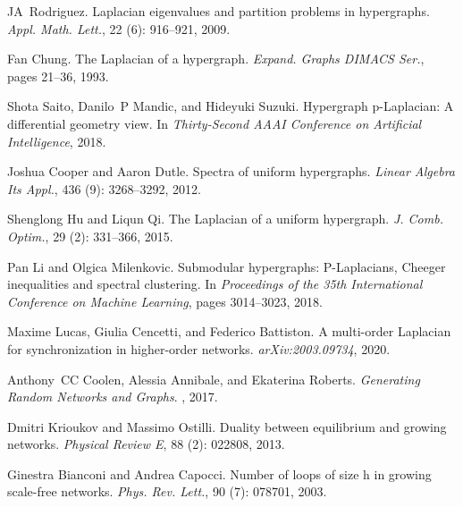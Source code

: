 JA~Rodriguez.
\newblock Laplacian eigenvalues and partition problems in hypergraphs.
\newblock \emph{Appl. Math. Lett.}, 22 (6): 916--921, 2009.

Fan Chung.
\newblock The {Laplacian} of a hypergraph.
\newblock \emph{Expand. Graphs DIMACS Ser.}, pages 21--36, 1993.

Shota Saito, Danilo~P Mandic, and Hideyuki Suzuki.
\newblock Hypergraph p-{{Laplacian}}: {{A}} differential geometry view.
\newblock In \emph{Thirty-Second {{AAAI}} Conference on Artificial
    Intelligence}, 2018.

Joshua Cooper and Aaron Dutle.
\newblock Spectra of uniform hypergraphs.
\newblock \emph{Linear Algebra Its Appl.}, 436 (9):
3268--3292, 2012.

Shenglong Hu and Liqun Qi.
\newblock The {Laplacian} of a uniform hypergraph.
\newblock \emph{J. Comb. Optim.}, 29 (2): 331--366, 2015.

Pan Li and Olgica Milenkovic.
\newblock Submodular hypergraphs: {P}-{Laplacians}, {Cheeger} inequalities and
spectral clustering.
\newblock In \emph{Proceedings of the 35th International Conference on Machine
    Learning}, pages 3014--3023, 2018.

Maxime Lucas, Giulia Cencetti, and Federico Battiston.
\newblock A multi-order {Laplacian} for synchronization in higher-order
networks.
\newblock \emph{arXiv:2003.09734}, 2020.

Anthony~CC Coolen, Alessia Annibale, and Ekaterina Roberts.
\newblock \emph{Generating Random Networks and Graphs}.
, 2017.

Dmitri Krioukov and Massimo Ostilli.
\newblock Duality between equilibrium and growing networks.
\newblock \emph{Physical Review E}, 88 (2): 022808, 2013.

Ginestra Bianconi and Andrea Capocci.
\newblock Number of loops of size h in growing scale-free networks.
\newblock \emph{Phys. Rev. Lett.}, 90 (7): 078701, 2003.

